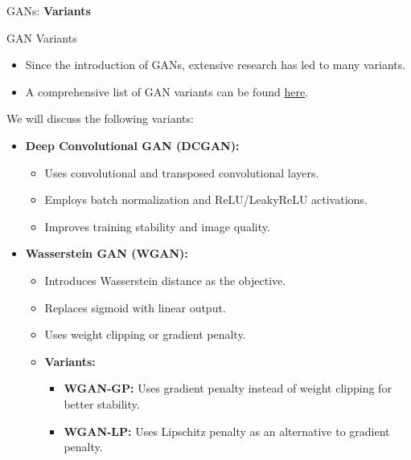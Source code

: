 \begin{frame}{}
    \LARGE GANs: \textbf{Variants}
\end{frame}

\begin{frame}[allowframebreaks]{GAN Variants}
\begin{itemize}
    \item Since the introduction of GANs, extensive research has led to many variants.
    \item A comprehensive list of GAN variants can be found \href{https://github.com/hindupuravinash/the-gan-zoo}{here}.
\end{itemize} 
    \framebreak
    
    We will discuss the following variants:
    \begin{itemize}
        \item \textbf{Deep Convolutional GAN (DCGAN):}
        \begin{itemize}
            \item Uses convolutional and transposed convolutional layers.
            \item Employs batch normalization and ReLU/LeakyReLU activations.
            \item Improves training stability and image quality.
        \end{itemize}
        \item \textbf{Wasserstein GAN (WGAN):} 
        \begin{itemize}
            \item Introduces Wasserstein distance as the objective.
            \item Replaces sigmoid with linear output.
            \item Uses weight clipping or gradient penalty.
            \item \textbf{Variants:}
            \begin{itemize}
                \item \textbf{WGAN-GP:} Uses gradient penalty instead of weight clipping for better stability.
                \item \textbf{WGAN-LP:} Uses Lipschitz penalty as an alternative to gradient penalty.
            \end{itemize}
        \end{itemize}

\framebreak


\end{itemize}
\end{frame}
